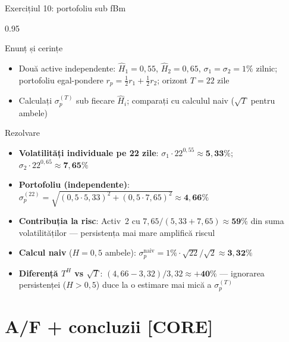 \documentclass[9pt, aspectratio=169, t]{beamer}
\begin{document}
\begin{frame}[shrink=20]{Exercițiul 10: portofoliu sub fBm}
\begin{cminipage}{0.95\textwidth}
\begin{block}{Enunț și cerințe}
\begin{itemize}\setlength{\itemsep}{0pt}
    \item Două active independente: $\hat H_1=0{,}55$, $\hat H_2=0{,}65$, $\sigma_1=\sigma_2=1\%$ zilnic; portofoliu egal-pondere $r_p=\tfrac12 r_1+\tfrac12 r_2$; orizont $T=22$ zile
    \item Calculați $\sigma_p^{(T)}$ sub fiecare $\hat H_i$; comparați cu calculul naiv ($\sqrt T$ pentru ambele)
\end{itemize}
\end{block}
\begin{exampleblock}{Rezolvare}
\begin{itemize}\setlength{\itemsep}{0pt}
    \item \textbf{Volatilități individuale pe 22 zile}: $\sigma_1\cdot 22^{0{,}55}\approx \mathbf{5{,}33\%}$; $\sigma_2\cdot 22^{0{,}65}\approx \mathbf{7{,}65\%}$
    \item \textbf{Portofoliu (independente)}: $\sigma_p^{(22)}=\sqrt{(0{,}5\cdot 5{,}33)^2+(0{,}5\cdot 7{,}65)^2}\approx \mathbf{4{,}66\%}$
    \item \textbf{Contribuția la risc}: Activ~2 cu $7{,}65/(5{,}33+7{,}65)\approx \mathbf{59\%}$ din suma volatilităților --- persistența mai mare amplifică riscul
    \item \textbf{Calcul naiv} ($H=0{,}5$ ambele): $\sigma_p^{\text{naiv}}=1\%\cdot\sqrt{22}/\sqrt 2\approx \mathbf{3{,}32\%}$
    \item \textbf{Diferență $T^H$ vs $\sqrt T$}: $(4{,}66-3{,}32)/3{,}32\approx \mathbf{+40\%}$ --- ignorarea persistenței ($H>0{,}5$) duce la o estimare mai mică a $\sigma_p^{(T)}$
\end{itemize}
\end{exampleblock}
\end{cminipage}
\end{frame}

\section{A/F + concluzii [CORE]}
\end{document}
